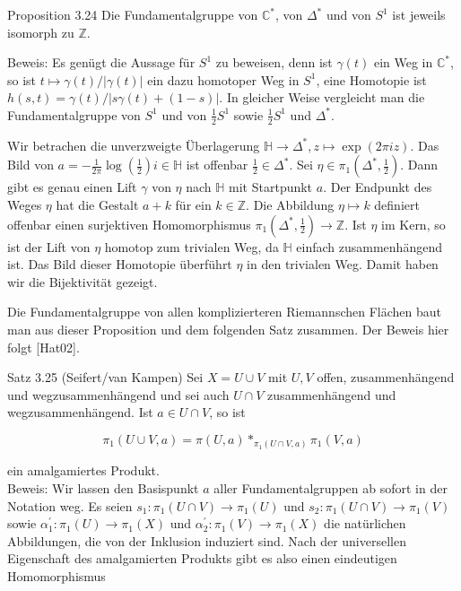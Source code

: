 \documentclass[10pt, letterpaper]{article}
\begin{document}
Proposition 3.24 Die Fundamentalgruppe von $\mathbb{C}^{*}$, von $\Delta^{*}$ und von $S^{1}$ ist jeweils isomorph zu $\mathbb{Z}$.

Beweis: Es genügt die Aussage für $S^{1}$ zu beweisen, denn ist $\gamma(t)$ ein Weg in $\mathbb{C}^{*}$, so ist $t \mapsto \gamma(t) /|\gamma(t)|$ ein dazu homotoper Weg in $S^{1}$, eine Homotopie ist $h(s, t)=\gamma(t) /|s \gamma(t)+(1-s)|$. In gleicher Weise vergleicht man die Fundamentalgruppe von $S^{1}$ und von $\frac{1}{2} S^{1}$ sowie $\frac{1}{2} S^{1}$ und $\Delta^{*}$.

Wir betrachen die unverzweigte Überlagerung $\mathbb{H} \rightarrow \Delta^{*}, z \mapsto \exp (2 \pi i z)$. Das Bild von $a=-\frac{1}{2 \pi} \log \left(\frac{1}{2}\right) i \in \mathbb{H}$ ist offenbar $\frac{1}{2} \in \Delta^{*}$. Sei $\eta \in \pi_{1}\left(\Delta^{*}, \frac{1}{2}\right)$. Dann gibt es genau einen Lift $\gamma$ von $\eta$ nach $\mathbb{H}$ mit Startpunkt $a$. Der Endpunkt des Weges $\eta$ hat die Gestalt $a+k$ für ein $k \in \mathbb{Z}$. Die Abbildung $\eta \mapsto k$ definiert offenbar einen surjektiven Homomorphismus $\pi_{1}\left(\Delta^{*}, \frac{1}{2}\right) \rightarrow \mathbb{Z}$. Ist $\eta$ im Kern, so ist der Lift von $\eta$ homotop zum trivialen Weg, da $\mathbb{H}$ einfach zusammenhängend ist. Das Bild dieser Homotopie überführt $\eta$ in den trivialen Weg. Damit haben wir die Bijektivität gezeigt.

Die Fundamentalgruppe von allen komplizierteren Riemannschen Flächen baut man aus dieser Proposition und dem folgenden Satz zusammen. Der Beweis hier folgt [Hat02].

Satz 3.25 (Seifert/van Kampen) Sei $X=U \cup V$ mit $U, V$ offen, zusammenhängend und wegzusammenhängend und sei auch $U \cap V$ zusammenhängend und wegzusammenhängend. Ist $a \in U \cap V$, so ist

$$
\pi_{1}(U \cup V, a)=\pi(U, a) *_{\pi_{1}(U \cap V, a)} \pi_{1}(V, a)
$$

ein amalgamiertes Produkt.\\
Beweis: Wir lassen den Basispunkt $a$ aller Fundamentalgruppen ab sofort in der Notation weg. Es seien $s_{1}: \pi_{1}(U \cap V) \rightarrow \pi_{1}(U)$ und $s_{2}: \pi_{1}(U \cap V) \rightarrow \pi_{1}(V)$ sowie $\alpha_{1}^{\prime}: \pi_{1}(U) \rightarrow \pi_{1}(X)$ und $\alpha_{2}^{\prime}: \pi_{1}(V) \rightarrow \pi_{1}(X)$ die natürlichen Abbildungen, die von der Inklusion induziert sind. Nach der universellen Eigenschaft des amalgamierten Produkts gibt es also einen eindeutigen Homomorphismus
\end{document}
